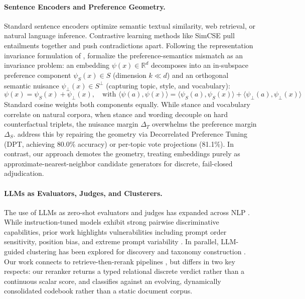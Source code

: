 \documentclass{article}
\begin{document}
\paragraph{Sentence Encoders and Preference Geometry.} Standard sentence encoders \citep{reimers2019sentence,muennighoff2023mteb} optimize semantic textual similarity, web retrieval, or natural language inference. Contrastive learning methods like SimCSE \citep{gao2021simcse} pull entailments together and push contradictions apart. Following the representation invariance formulation of \citet{achille2018emergence}, \citet{blair2026embeddings} formalize the preference-semantics mismatch as an invariance problem: an embedding $\psi(x) \in \mathbb{R}^d$ decomposes into an in-subspace preference component $\psi_S(x) \in S$ (dimension $k \ll d$) and an orthogonal semantic nuisance $\psi_\perp(x) \in S^\perp$ (capturing topic, style, and vocabulary):
\begin{equation}
\psi(x) = \psi_S(x) + \psi_\perp(x), \quad \text{with } \langle \psi(a), \psi(x) \rangle = \langle \psi_S(a), \psi_S(x) \rangle + \langle \psi_\perp(a), \psi_\perp(x) \rangle
\end{equation}
Standard cosine weights both components equally. While stance and vocabulary correlate on natural corpora, when stance and wording decouple on hard counterfactual triplets, the nuisance margin $\Delta_T$ overwhelms the preference margin $\Delta_S$. \citet{blair2026embeddings} address this by repairing the geometry via Decorrelated Preference Tuning (DPT, achieving 80.0\% accuracy) or per-topic vote projections (81.1\%). In contrast, our approach demotes the geometry, treating embeddings purely as approximate-nearest-neighbor candidate generators for discrete, fail-closed adjudication.

\paragraph{LLMs as Evaluators, Judges, and Clusterers.} The use of LLMs as zero-shot evaluators and judges has expanded across NLP \citep{zheng2023judging}. While instruction-tuned models exhibit strong pairwise discriminative capabilities, prior work highlights vulnerabilities including prompt order sensitivity, position bias, and extreme prompt variability \citep{wang2023large,sclar2024quantifying,liu2024lost}. In parallel, LLM-guided clustering has been explored for discovery and taxonomy construction \citep{zhang2023clusterllm,viswanathan2024large}. Our work connects to retrieve-then-rerank pipelines \citep{nogueira2019passage,lewis2020retrieval}, but differs in two key respects: our reranker returns a typed relational discrete verdict rather than a continuous scalar score, and classifies against an evolving, dynamically consolidated codebook rather than a static document corpus.
\end{document}
